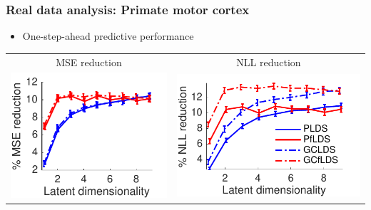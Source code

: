 \documentclass[16pt,presentation]{beamer}
\begin{document}
\begin{frame}
\frametitle{Real data analysis: Primate motor cortex}
\begin{itemize}
\item One-step-ahead predictive performance
\end{itemize}
\begin{center}
\begin{tabular}{ cc} 
{\small MSE reduction} & {\small NLL reduction}\\
\includegraphics[scale = 0.6]{./figs/flds/fig_GeorgeMove_MSE_GC.pdf}&
\includegraphics[scale = 0.6]{./figs/flds/fig_GeorgeMove_NLL_GC.pdf}
\end{tabular}
\end{center}
\end{frame}
\end{document}
